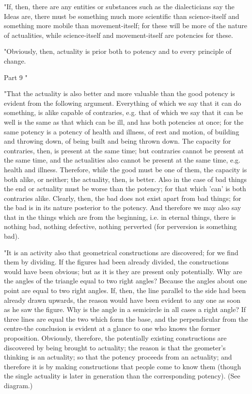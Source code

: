 "If, then, there are any entities or substances such as the dialecticians
say the Ideas are, there must be something much more scientific than
science-itself and something more mobile than movement-itself; for
these will be more of the nature of actualities, while science-itself
and movement-itself are potencies for these. 

"Obviously, then, actuality is prior both to potency and to every
principle of change. 

Part 9 "

"That the actuality is also better and more valuable than the good
potency is evident from the following argument. Everything of which
we say that it can do something, is alike capable of contraries, e.g.
that of which we say that it can be well is the same as that which
can be ill, and has both potencies at once; for the same potency is
a potency of health and illness, of rest and motion, of building and
throwing down, of being built and being thrown down. The capacity
for contraries, then, is present at the same time; but contraries
cannot be present at the same time, and the actualities also cannot
be present at the same time, e.g. health and illness. Therefore, while
the good must be one of them, the capacity is both alike, or neither;
the actuality, then, is better. Also in the case of bad things the
end or actuality must be worse than the potency; for that which 'can'
is both contraries alike. Clearly, then, the bad does not exist apart
from bad things; for the bad is in its nature posterior to the potency.
And therefore we may also say that in the things which are from the
beginning, i.e. in eternal things, there is nothing bad, nothing defective,
nothing perverted (for perversion is something bad). 

"It is an activity also that geometrical constructions are discovered;
for we find them by dividing. If the figures had been already divided,
the constructions would have been obvious; but as it is they are present
only potentially. Why are the angles of the triangle equal to two
right angles? Because the angles about one point are equal to two
right angles. If, then, the line parallel to the side had been already
drawn upwards, the reason would have been evident to any one as soon
as he saw the figure. Why is the angle in a semicircle in all cases
a right angle? If three lines are equal the two which form the base,
and the perpendicular from the centre-the conclusion is evident at
a glance to one who knows the former proposition. Obviously, therefore,
the potentially existing constructions are discovered by being brought
to actuality; the reason is that the geometer's thinking is an actuality;
so that the potency proceeds from an actuality; and therefore it is
by making constructions that people come to know them (though the
single actuality is later in generation than the corresponding potency).
(See diagram.) 

